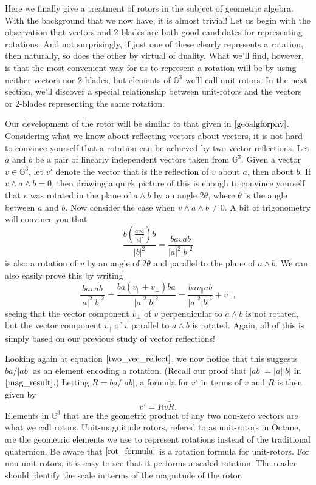 \documentclass{article}
\newcommand{\G}{\mathbb{G}}
\newcommand{\prl}{\parallel}
\newcommand{\prp}{\perp}
\begin{document}
Here we finally give a treatment of rotors in the subject of geometric
algebra.  With the background that we now have, it is almost trivial!
Let us begin with the observation that vectors and 2-blades are both
good candidates for representing rotations.
And not surprisingly, if just one of these clearly
represents a rotation, then naturally, so does the other by virtual of
duality.
What we'll find, however, is that the most convenient way for us to
represent a rotation will be by using neither vectors nor 2-blades, but
elements of $\G^3$ we'll call unit-rotors.  In the next section,
we'll discover a special relationship between unit-rotors and the vectors or 2-blades
representing the same rotation.

Our development of the rotor will be similar to that given in $\cite{geoalgforphy}$.
Considering what we know about reflecting vectors about vectors, it is not hard
to convince yourself that a rotation can be achieved by two vector reflections.
Let $a$ and $b$ be a pair of linearly independent vectors taken from $\G^3$.
Given a vector $v\in\G^3$, let $v'$ denote the vector that is the reflection of
$v$ about $a$, then about $b$.  If $v\wedge a\wedge b=0$, then drawing a quick
picture of this is enough to convince yourself that $v$ was rotated in the plane
of $a\wedge b$ by an angle $2\theta$, where $\theta$ is the angle between
$a$ and $b$.  Now consider the case when $v\wedge a\wedge b\neq 0$.
A bit of trigonometry will convince you that 
\begin{equation}\label{two_vec_reflect}
\frac{b\left(\frac{ava}{|a|^2}\right)b}{|b|^2} = \frac{bavab}{|a|^2|b|^2}
\end{equation}
is also a rotation of $v$ by an angle of $2\theta$ and parallel to the
plane of $a\wedge b$.  We can also easily prove this by writing
\begin{equation*}
\frac{bavab}{|a|^2|b|^2} = \frac{ba(v_{\prl}+v_{\prp})ba}{|a|^2|b|^2} =
\frac{bav_{\prl}ab}{|a|^2|b|^2} + v_{\prp},
\end{equation*}
seeing that the vector component $v_{\prp}$ of $v$ perpendicular to $a\wedge b$
is not rotated, but the vector component $v_{\prl}$ of $v$ parallel to $a\wedge b$
is rotated.  Again, all of this is simply based on our previous study of vector
reflections!

Looking again at equation $\eqref{two_vec_reflect}$, we now notice that
this suggests $ba/|ab|$ as an element encoding a rotation.
(Recall our proof that $|ab|=|a||b|$ in $\eqref{mag_result}$.)
Letting $R=ba/|ab|$, a formula for $v'$ in terms of $v$ and $R$ is
then given by
\begin{equation}\label{rot_formula}
v' = Rv\tilde{R}.
\end{equation}
Elements in $\G^3$ that are the geometric product of any two non-zero vectors
are what we call rotors.  Unit-magnitude rotors, refered to as
unit-rotors in Octane, are the geometric elements we use to represent
rotations instead of the traditional quaternion.
Be aware that $\eqref{rot_formula}$ is a rotation formula for unit-rotors.
For non-unit-rotors, it is easy to see that it performs a scaled rotation.
The reader should identify the scale in terms of the magnitude of the rotor.
\end{document}
